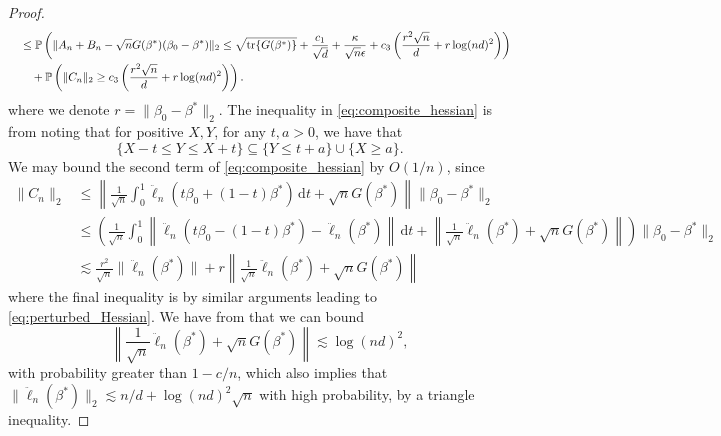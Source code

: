 \documentclass[11pt]{article}
\newcommand{\dint}{\,\mathrm{d}}
\begin{document}
\begin{proof}
\begin{align}
    & \quad\leq \mathbb{P} \left(\|A_n + B_n - \sqrt{n} G(\beta^*)(\beta_0 - \beta^*)\|_2 \leq  \sqrt{\mathrm{tr}\{G(\beta^*)\}} + \frac{c_1}{\sqrt{d}} + \frac{\kappa}{\sqrt{n} \epsilon}+ c_3 \left(\frac{r^2 \sqrt{n}}{d} + r \log(nd)^2 \right) \right) \notag\\
    &\quad \quad +  \mathbb{P} \left(\|C_n\|_2 \geq c_3 \left(\frac{r^2 \sqrt{n}}{d} + r \log(nd)^2 \right)\right).
    \label{eq:composite_hessian}
\end{align}
where we denote $r= \|\beta_0 - \beta^*\|_2$. The inequality in \eqref{eq:composite_hessian} is from noting that for positive $X, Y$, for any $t, a >0$, we have that 
\begin{equation*}
    \{X-t \leq Y \leq X+t \} \subseteq \{Y \leq t+a\} \cup \{X \geq a\}.
\end{equation*}
We may bound the second term of \eqref{eq:composite_hessian} by $O(1/n)$, since 
\begin{align*}
    \|C_n\|_2 &\leq  \left\|\frac{1}{\sqrt{n}} \int_0^1 \ddot{\ell}_n(t\beta_0 + (1-t)\beta^*) \dint t + \sqrt{n} G(\beta^*) \right\| \|\beta_0 - \beta^*\|_2 \\
    &\leq \left( \frac{1}{\sqrt{n}} \int_0^1 \left\| \ddot{\ell}_n(t\beta_0 - (1-t) \beta^*) - \ddot{\ell}_n(\beta^*) \right\| \dint t + \left\| \frac{1}{\sqrt{n}} \ddot{\ell}_n(\beta^*) + \sqrt{n} G(\beta^*)\right\| \right) \|\beta_0 - \beta^*\|_2\\
    &\lesssim \frac{r^2}{\sqrt{n}}\|\ddot{\ell}_n(\beta^*)\| + r\left\| \frac{1}{\sqrt{n}} \ddot{\ell}_n(\beta^*) + \sqrt{n} G(\beta^*)\right\|
\end{align*}
where the final inequality is by similar arguments leading to \eqref{eq:perturbed_Hessian}. We have from  that we can bound 
\begin{equation*}
\left\| \frac{1}{\sqrt{n}} \ddot{\ell}_n(\beta^*) + \sqrt{n} G(\beta^*)\right\|\lesssim \log(nd)^2, 
\end{equation*}
with probability greater than $1-c/n$, which also implies that $\| \ddot{\ell}_n(\beta^*)\|_2 \lesssim n/d + \log(nd)^2\sqrt{n}$ with high probability, by a triangle inequality.  


\end{proof}
\end{document}
